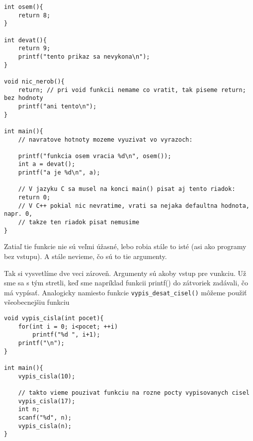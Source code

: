 \begin{lstlisting}
int osem(){
    return 8;
}

int devat(){
    return 9;
    printf("tento prikaz sa nevykona\n");
}

void nic_nerob(){
    return; // pri void funkcii nemame co vratit, tak piseme return; bez hodnoty
    printf("ani tento\n");
}

int main(){
    // navratove hotnoty mozeme vyuzivat vo vyrazoch:

    printf("funkcia osem vracia %d\n", osem());
    int a = devat();
    printf("a je %d\n", a);

    // V jazyku C sa musel na konci main() pisat aj tento riadok:
    return 0;
    // V C++ pokial nic nevratime, vrati sa nejaka defaultna hodnota, napr. 0,
    // takze ten riadok pisat nemusime
}   
\end{lstlisting}

\medskip
    
Zatiaľ tie funkcie nie sú veľmi úžasné, lebo robia stále to isté (asi ako programy bez vstupu).
A stále nevieme, čo sú to tie argumenty.

Tak si vysvetlíme dve veci zároveň. Argumenty sú akoby vstup pre vunkciu.
Už sme sa s tým stretli, keď sme napríklad funkcii printf() do zátvoriek zadávali, čo má vypísať.
Analogicky namiesto funkcie \verb!vypis_desat_cisel()! môžeme použiť všeobecnejšiu funkciu

\begin{lstlisting}
void vypis_cisla(int pocet){
    for(int i = 0; i<pocet; ++i)
        printf("%d ", i+1);
    printf("\n"); 
}

int main(){
    vypis_cisla(10);

    // takto vieme pouzivat funkciu na rozne pocty vypisovanych cisel
    vypis_cisla(17);
    int n;
    scanf("%d", n);
    vypis_cisla(n);
}
\end{lstlisting}











